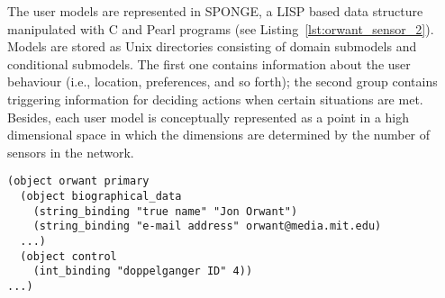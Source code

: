 The user models are represented in SPONGE, a LISP based data structure manipulated with
C and Pearl programs \citep{orwant_heterogeneous_1994} (see Listing~\ref{lst:orwant_sensor_2}). 
Models are stored as Unix directories consisting of domain submodels and conditional 
submodels. The first one contains information about the user behaviour (i.e., 
location, preferences, and so forth); the second group contains triggering information 
for deciding actions when certain situations are met. Besides, each user model 
is conceptually represented as a point in a high dimensional space in which the 
dimensions are determined by the number of sensors in the network.


% 

\begin{verbatim}
(object orwant primary
  (object biographical_data
    (string_binding "true name" "Jon Orwant")
    (string_binding "e-mail address" orwant@media.mit.edu)
  ...)
  (object control
    (int_binding "doppelganger ID" 4))
...)
\end{verbatim}


